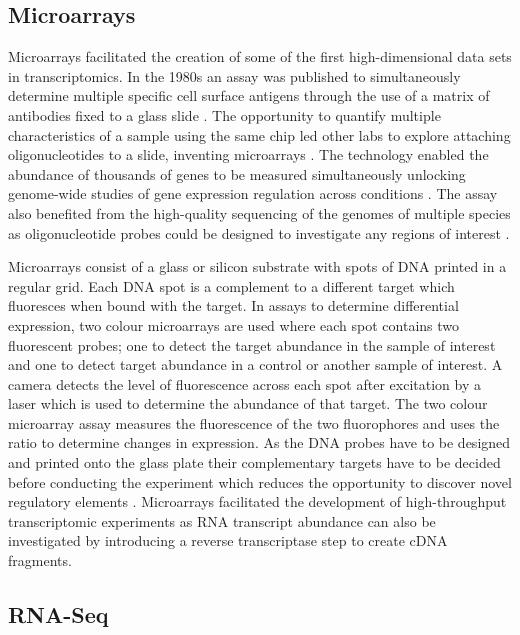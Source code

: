 \documentclass[../main.tex]{subfiles}
\begin{document}
\subsection{Microarrays}

Microarrays facilitated the creation of some of the first high-dimensional data sets in transcriptomics.
In the 1980s an assay was published to simultaneously determine multiple specific cell surface antigens through the use of a matrix of antibodies fixed to a glass slide \parencite{TseWen1983}.
The opportunity to quantify multiple characteristics of a sample using the same chip led other labs to explore attaching oligonucleotides to a slide, inventing microarrays \parencite{Schena1995}.
The technology enabled the abundance of thousands of genes to be measured simultaneously unlocking genome-wide studies of gene expression regulation across conditions \parencite{Gasch2000}. 
The assay also benefited from the high-quality sequencing of the genomes of multiple species as oligonucleotide probes could be designed to investigate any regions of interest \parencite{Lander2001}.

Microarrays consist of a glass or silicon substrate with spots of DNA printed in a regular grid. 
Each DNA spot is a complement to a different target which fluoresces when bound with the target. 
In assays to determine differential expression, two colour microarrays are used where each spot contains two fluorescent probes; one to detect the target abundance in the sample of interest and one to detect target abundance in a control or another sample of interest.
A camera detects the level of fluorescence across each spot after excitation by a laser which is used to determine the abundance of that target.  
The two colour microarray assay measures the fluorescence of the two fluorophores and uses the ratio to determine changes in expression.
As the DNA probes have to be designed and printed onto the glass plate their complementary targets have to be decided before conducting the experiment which reduces the opportunity to discover novel regulatory elements \parencite{Schena1995}.
Microarrays facilitated the development of high-throughput transcriptomic experiments as RNA transcript abundance can also be investigated by introducing a reverse transcriptase step to create cDNA fragments. 

\subsection{RNA-Seq}
\end{document}
